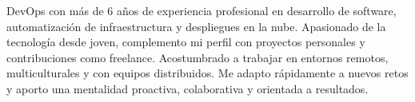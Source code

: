 

\begin{cvparagraph}

DevOps con más de 6 años de experiencia profesional en desarrollo de software, automatización de infraestructura y despliegues en la nube. Apasionado de la tecnología desde joven, complemento mi perfil con proyectos personales y contribuciones como freelance. Acostumbrado a trabajar en entornos remotos, multiculturales y con equipos distribuidos. Me adapto rápidamente a nuevos retos y aporto una mentalidad proactiva, colaborativa y orientada a resultados.
\end{cvparagraph}